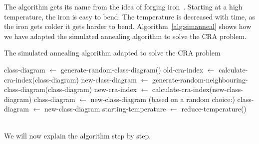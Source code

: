 \documentclass[a4paper]{article}
\begin{document}
The algorithm gets its name from the idea of forging iron~\cite{Annealing}.
Starting at a high temperature, the iron is easy to bend.
The temperature is decreased with time, as the iron gets colder it gets harder to bend.
Algorithm~\ref{alg:simanneal} shows how we have adapted the simulated annealing algorithm to solve the CRA problem.


\begin{algorithm}[H]
	\caption{The simulated annealing algorithm adapted to solve the CRA problem}
	\label{alg:simanneal}
	class-diagram $\leftarrow$ generate-random-class-diagram()\;
		{
			old-cra-index $\leftarrow$ calculate-cra-index(class-diagram)\;
			new-class-diagram $\leftarrow$ generate-random-neighbouring-class-diagram(class-diagram)\;
			new-cra-index $\leftarrow$ calculate-cra-index(new-class-diagram)\;
			{
				class-diagram $\leftarrow$ new-class-diagram\;
			}
			\Else(based on a random choice:){
				class-diagram $\leftarrow$ new-class-diagram\;}
			starting-temperature $\leftarrow$ reduce-temperature()\;			
		}
		
\end{algorithm}


~\\

We will now explain the algorithm step by step.
\end{document}
